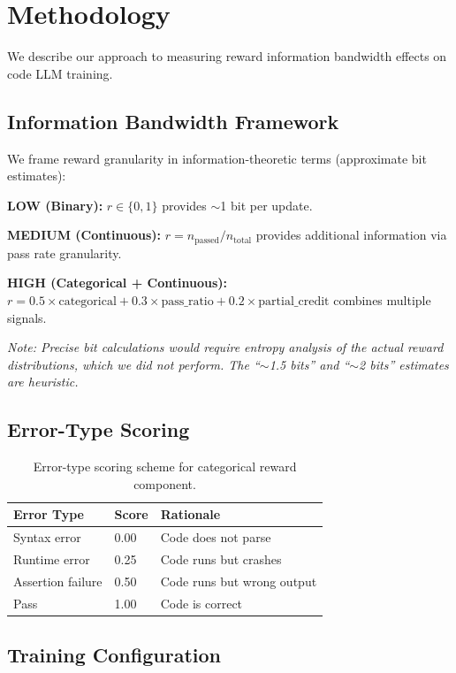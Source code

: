 \section{Methodology}

We describe our approach to measuring reward information bandwidth effects on code LLM training.

\subsection{Information Bandwidth Framework}

We frame reward granularity in information-theoretic terms (approximate bit estimates):

\textbf{LOW (Binary):} $r \in \{0, 1\}$ provides $\sim$1 bit per update.

\textbf{MEDIUM (Continuous):} $r = n_{\text{passed}} / n_{\text{total}}$ provides additional information via pass rate granularity.

\textbf{HIGH (Categorical + Continuous):} $r = 0.5 \times \text{categorical} + 0.3 \times \text{pass\_ratio} + 0.2 \times \text{partial\_credit}$ combines multiple signals.

\emph{Note: Precise bit calculations would require entropy analysis of the actual reward distributions, which we did not perform. The ``$\sim$1.5 bits'' and ``$\sim$2 bits'' estimates are heuristic.}

\subsection{Error-Type Scoring}

\begin{table}[h]
\centering
\begin{tabular}{@{}lll@{}}
\toprule
Error Type & Score & Rationale \\
\midrule
Syntax error & 0.00 & Code does not parse \\
Runtime error & 0.25 & Code runs but crashes \\
Assertion failure & 0.50 & Code runs but wrong output \\
Pass & 1.00 & Code is correct \\
\bottomrule
\end{tabular}
\caption{Error-type scoring scheme for categorical reward component.}
\label{tab:error-scoring}
\end{table}

\subsection{Training Configuration}

